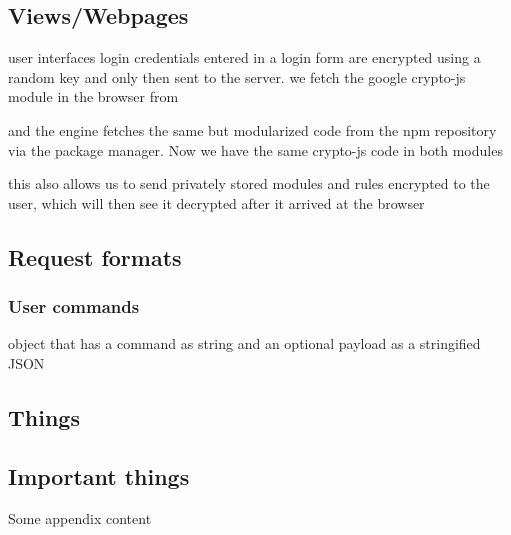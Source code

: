 \documentclass{article}
\begin{document}
\subsection{Views/Webpages}
user interfaces
login
credentials entered in a login form are encrypted using a random key and only then sent to the server.
we fetch the google crypto-js module in the browser from

and the engine fetches the same but modularized code from the npm repository via the package manager. Now we have the same crypto-js code in both modules

this also allows us to send privately stored modules and rules encrypted to the user, which will then see it decrypted after it arrived at the browser

\subsection{Request formats}

\subsubsection{User commands}
object that has a command as string and an optional payload as a stringified JSON





\newpage
\renewcommand*\appendixpagename{APPENDIX}
\renewcommand*\appendixtocname{APPENDIX}
\begin{appendices}
 \section{Things}
   \subsection{Important things}
 Some appendix content
 
\end{appendices}
\end{document}
